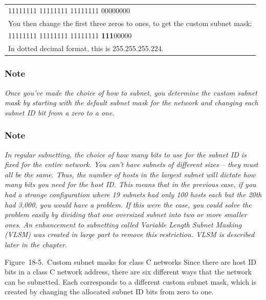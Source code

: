 \documentclass[b5paper,11pt]{memoir}
\begin{document}
\begin{longtable}[]{@{}l@{}}
\toprule
\endhead
11111111 11111111 11111111 00000000\tabularnewline
You then change the first three zeros to ones, to get the custom subnet
mask:\tabularnewline
11111111 11111111 11111111 {\textbf{111}}00000\tabularnewline
In dotted decimal format, this is 255.255.255.224.\tabularnewline
\bottomrule
\end{longtable}

\subsubsection[Note]{\texorpdfstring{\protect\hypertarget{ch18s05.htmlux5cux23note-71}{}{}Note}{Note}}

{\emph{Once you've made the choice of how to subnet, you determine the
custom subnet mask by starting with the default subnet mask for the
network and changing each subnet ID bit from a zero to a one}}.

\subsubsection[Note]{\texorpdfstring{\protect\hypertarget{ch18s05.htmlux5cux23note-72}{}{}Note}{Note}}

{\emph{In regular subnetting, the choice of how many bits to use for the
subnet ID is fixed for the entire network. You can't have subnets of
different sizes -- they must all be the same. Thus, the number of hosts
in the largest subnet will dictate how many bits you need for the host
ID. This means that in the previous case, if you had a strange
configuration where 19 subnets had only 100 hosts each but the 20th had
3,000, you would have a problem. If this were the case, you could solve
the problem easily by dividing that one oversized subnet into two or
more smaller ones. An enhancement to subnetting called Variable Length
Subnet Masking (VLSM) was created in large part to remove this
restriction.
VLSM is described later in the chapter}}.

\protect\hypertarget{ch18s05.htmlux5cux23custom_subnet_masks_for_class_c_networks}{}{}

\protect\hypertarget{ch18s05.htmlux5cux23I_mediaobject4_d1e18747}{}{}

Figure~18-5.~Custom subnet masks for class C networks Since there are
host ID bits in a class C network address, there are six different ways
that the network can be subnetted. Each corresponds to a different
custom subnet mask, which is created by changing the allocated subnet ID
bits from zero to one.
\end{document}
